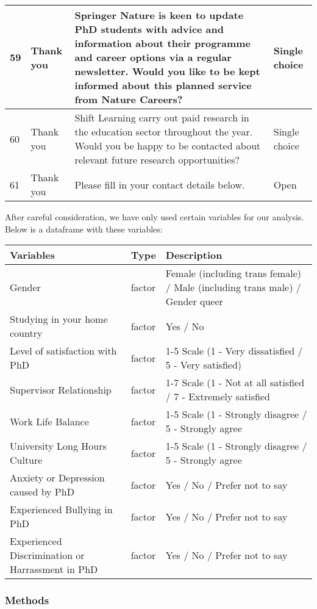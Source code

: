 \documentclass[
]{article}
\begin{document}
\begin{tabular}{l|l|l|l}
\hline
59 & Thank you & Springer Nature is keen to update PhD students with advice and information about their programme and career options via a regular newsletter. Would you like to be kept informed about this planned service from Nature Careers? & Single choice\\
\hline
60 & Thank you & Shift Learning carry out paid research in the education sector throughout the year. Would you be happy to be contacted about relevant future research opportunities? & Single choice\\
\hline
61 & Thank you & Please fill in your contact details below. & Open\\
\hline
\end{tabular}

After careful consideration, we have only used certain variables for our
analysis. Below is a dataframe with these variables:

\begin{tabular}{l|l|l}
\hline
Variables & Type & Description\\
\hline
Gender & factor & Female (including trans female) / Male (including trans male) / Gender queer\\
\hline
Studying in your home country & factor & Yes / No\\
\hline
Level of satisfaction with PhD & factor & 1-5 Scale (1 - Very dissatisfied / 5 - Very satisfied)\\
\hline
Supervisor Relationship & factor & 1-7 Scale (1 - Not at all satisfied / 7 - Extremely satisfied\\
\hline
Work Life Balance & factor & 1-5 Scale (1 - Strongly disagree / 5 - Strongly agree\\
\hline
University Long Hours Culture & factor & 1-5 Scale (1 - Strongly disagree / 5 - Strongly agree\\
\hline
Anxiety or Depression caused by PhD & factor & Yes / No / Prefer not to say\\
\hline
Experienced Bullying in PhD & factor & Yes / No / Prefer not to say\\
\hline
Experienced Discrimination or Harrassment in PhD & factor & Yes / No / Prefer not to say\\
\hline
\end{tabular}

\hypertarget{methods}{%
\subsubsection{Methods}\label{methods}}
\end{document}
